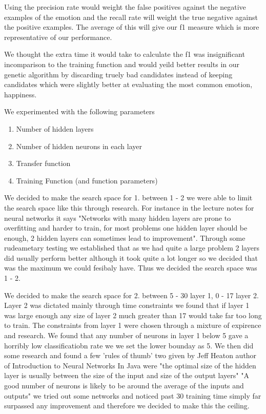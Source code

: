 \documentclass[11pt]{article}
\begin{document}
Using the precision rate would weight the false positives against the negative examples of the emotion and the recall rate will weight the true negative against the positive examples. The average of this will give our f1 measure which is more representative of our performance. 

We thought the extra time it would take to calculate the f1 was insignificant incomparison to the training function and would yeild better results in our genetic algorithm by discarding truely bad candidates instead of keeping candidates which were slightly better at evaluating the most common emotion, happiness.

We experimented with the following parameters
\begin{enumerate}
  \item Number of hidden layers
  \item Number of hidden neurons in each layer
  \item Transfer function
  \item Training Function (and function parameters)
\end{enumerate}

We decided to make the search space for 1. between 1 - 2 we were able to limit the search space like this through research. For instance in the lecture notes for neural networks it says "Networks with many hidden layers are prone to overfitting and harder to train, for most problems one hidden layer should be enough, 2 hidden layers can sometimes lead to improvement". Through some
rudeametary testing we established that as we had quite a large problem 2 layers did usually perform better although it took
quite a lot longer so we decided that was the maximum we could fesibaly have. Thus we decided the search space was 1 - 2.

We decided to make the search space for 2. between 5 - 30 layer 1, 0 - 17 layer 2. Layer 2 was dictated mainly through time
constraints we found that if layer 1 was large enough any size of layer 2 much greater than 17 would take far too long to train.
The constraints from layer 1 were chosen through a mixture of expirence and research. We found that any number of neurons in layer
1 below 5 gave a horribly low classificatiobn rate we we set the lower bounday as 5. We then did some research and found a few 'rules of thumb' two given by Jeff Heaton author of Introduction to Neural Networks In Java were "the optimal size of the hidden layer is usually between the size of the input and size of the output layers" "A good number of neurons is likely to be around the average of the inputs and outputs" we tried out some networks and noticed past 30 training time simply far surpassed any improvement and therefore we decided to make this the ceiling.
\end{document}
